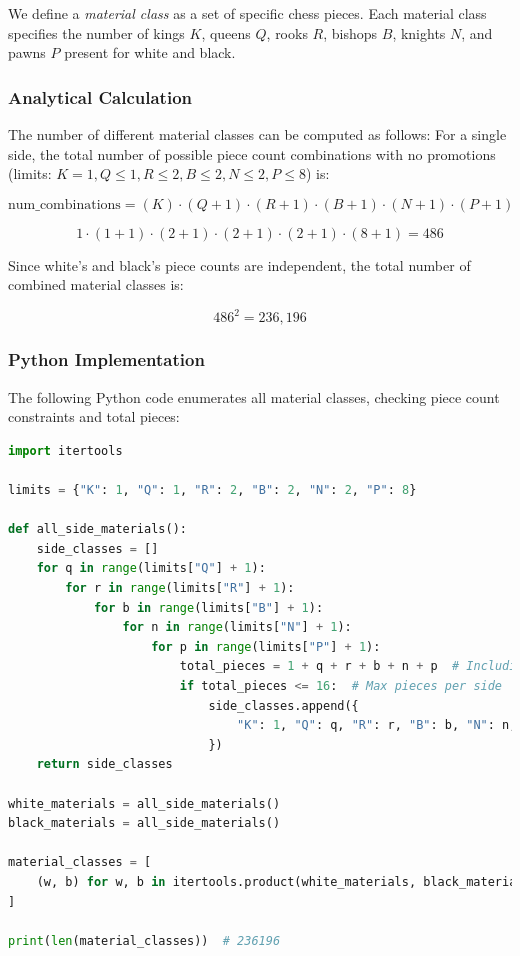 \documentclass[12pt]{article}
\begin{document}
We define a \emph{material class} as a set of specific chess pieces. Each material class specifies the number of kings $K$, queens $Q$, rooks $R$, bishops $B$, knights $N$, and pawns $P$ present for white and black.

\subsubsection{Analytical Calculation}

The number of different material classes can be computed as follows: 
For a single side, the total number of possible piece count combinations with no promotions 
(limits: $K = 1, Q \le 1, R \le 2, B \le 2, N \le 2, P \le 8$) is:

\[
\text{num\_combinations} = (K) \cdot (Q + 1) \cdot (R + 1) \cdot (B + 1) \cdot (N + 1) \cdot (P + 1)
\]

\[
1 \cdot (1 + 1) \cdot (2 + 1) \cdot (2 + 1) \cdot (2 + 1) \cdot (8 + 1) = 486
\]

Since white's and black's piece counts are independent, the total number of
combined material classes is:

\[
486^2 = 236{,}196
\]

\subsubsection{Python Implementation}

The following Python code enumerates all material classes, checking piece
count constraints and total pieces:

\begin{lstlisting}[language=Python, caption={Enumeration of all material classes in chess}, label={lst:material-classes}]
import itertools

limits = {"K": 1, "Q": 1, "R": 2, "B": 2, "N": 2, "P": 8}

def all_side_materials():
    side_classes = []
    for q in range(limits["Q"] + 1):
        for r in range(limits["R"] + 1):
            for b in range(limits["B"] + 1):
                for n in range(limits["N"] + 1):
                    for p in range(limits["P"] + 1):
                        total_pieces = 1 + q + r + b + n + p  # Including 1 king always
                        if total_pieces <= 16:  # Max pieces per side
                            side_classes.append({
                                "K": 1, "Q": q, "R": r, "B": b, "N": n, "P": p
                            })
    return side_classes

white_materials = all_side_materials()
black_materials = all_side_materials()

material_classes = [
    (w, b) for w, b in itertools.product(white_materials, black_materials)
]

print(len(material_classes))  # 236196
\end{lstlisting}
\end{document}
